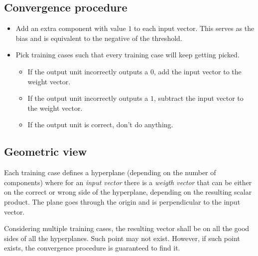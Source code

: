 \documentclass[a4paper]{article}
\begin{document}
\subsection{Convergence procedure}

\begin{itemize}
    \item Add an extra component with value \(1\) to each input vector.
        This serves as the bias and is equivalent to the negative of the threshold.
    \item Pick training cases such that every training case will keep getting picked.
    \begin{itemize}
        \item If the output unit incorrectly outputs a \(0\), add the input vector to the weight vector.
        \item If the output unit incorrectly outputs a \(1\), subtract the input vector to the weight vector.
        \item If the output unit is correct, don't do anything.
    \end{itemize}
\end{itemize}


\subsection{Geometric view}

Each training case defines a hyperplane (depending on the number of components) where
for an \textit{input vector} there is a \textit{weigth vector} that can be either on the
correct or wrong side of the hyperplane, depending on the resulting scalar product.
The plane goes through the origin and is perpendicular to the input vector.

Considering multiple training cases, the resulting vector shall be on all the good sides of all the hyperplanes.
Such point may not exist. However, if such point exists, the convergence procedure is guaranteed to find it.



\end{document}
